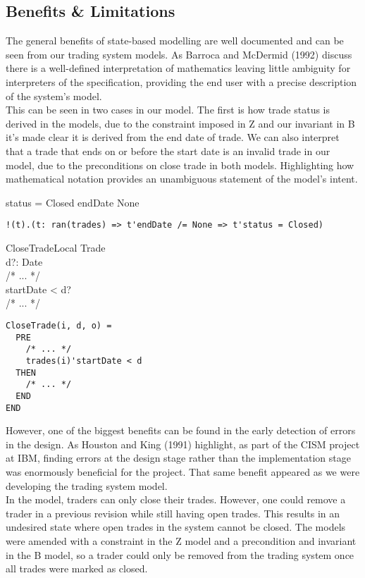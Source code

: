 \documentclass{article}
\begin{document}
\pagebreak
\subsection*{Benefits \& Limitations}

The general benefits of state-based modelling are well documented and can be seen from our trading system models. As Barroca and McDermid (1992) discuss there is a well-defined interpretation of mathematics leaving little ambiguity for interpreters of the specification, providing the end user with a precise description of the system's model. \\
\newline
This can be seen in two cases in our model. The first is how trade status is derived in the models, due to the constraint imposed in Z and our invariant in B it’s made clear it is derived from the end date of trade. We can also interpret that a trade that ends on or before the start date is an invalid trade in our model, due to the preconditions on close trade in both models. Highlighting how mathematical notation provides an unambiguous statement of the model's intent.
\begin{zed}
status = Closed \implies endDate \neq None \\
\end{zed}

\begin{verbatim}
!(t).(t: ran(trades) => t'endDate /= None => t'status = Closed)
\end{verbatim}
  
\vspace{-0.4cm}

\begin{schema}{CloseTradeLocal}
\Delta Trade \\
d?: Date \\ 
/* ... */ \\
\where  
startDate < d? \\
/* ... */ \\
\end{schema}

\begin{verbatim}
CloseTrade(i, d, o) =
  PRE
    /* ... */
    trades(i)'startDate < d
  THEN
    /* ... */
  END
END 
\end{verbatim}

\hspace{-0.68cm} However, one of the biggest benefits can be found in the early detection of errors in the design. As Houston and King (1991) highlight, as part of the CISM project at IBM, finding errors at the design stage rather than the implementation stage was enormously beneficial for the project. That same benefit appeared as we were developing the trading system model. \\
\newline
In the model, traders can only close their trades. However, one could remove a trader in a previous revision while still having open trades. This results in an undesired state where open trades in the system cannot be closed. The models were amended with a constraint in the Z model and a precondition and invariant in the B model, so a trader could only be removed from the trading system once all trades were marked as closed.
\end{document}
